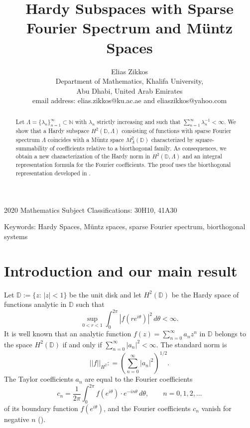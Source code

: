 \documentclass[11pt, a4paper]{article}
\begin{document}
\title{Hardy Subspaces with Sparse Fourier Spectrum and M\"{u}ntz Spaces}
\author{Elias Zikkos\\
Department of Mathematics, Khalifa University, \\
Abu Dhabi, United Arab Emirates\\
email address:  elias.zikkos@ku.ac.ae and eliaszikkos@yahoo.com}



\maketitle

\begin{abstract}
Let $\Lambda=\{\lambda_n\}_{n=1}^{\infty}\subset\mathbb{N}$ with $\lambda_n$ strictly increasing and such that
$\sum_{n=1}^{\infty}\lambda_n^{-1}<\infty$.
We show that a Hardy subspace $H^2 (\mathbb{D}, \Lambda)$ consisting of functions with sparse Fourier spectrum $\Lambda$
coincides with a M\"{u}ntz space $\overline{M^2_{\Lambda}}(\mathbb{D})$ characterized by square-summability of coefficients relative to a biorthogonal family. As consequences, we obtain a new characterization of the Hardy norm in $H^2 (\mathbb{D}, \Lambda)$ and an integral representation formula for the Fourier coefficients. The proof uses the biorthogonal representation developed in
\cite{Zikkos2026Acta}.
\end{abstract}



2020 Mathematics Subject Classifications: 30H10, 41A30

Keywords: Hardy Spaces, M\"{u}ntz spaces, sparse Fourier spectrum, biorthogonal systems


\section{Introduction and our main result}


Let $\mathbb{D}:=\{z:\, |z|<1\}$ be the unit disk and let  $H^2(\mathbb{D})$ be the Hardy space of functions analytic in
$\mathbb{D}$ such that
\[
\sup_{0<r<1} \int_{0}^{2\pi} |f(re^{i\theta})|^2\, d\theta<\infty.
\]
It is well known that an analytic function $f(z)=\sum_{n=0}^{\infty} a_n z^n$ in
$\mathbb{D}$ belongs to the space $H^2(\mathbb{D})$
if and only if $\sum_{n=0}^{\infty} |a_n|^2<\infty$. The standard norm is
\[
||f||_{H^2} : = \left(\sum_{n=0}^{\infty} |a_n|^2\right)^{1/2}.
\]
The Taylor coefficients $a_n$ are equal to the Fourier coefficients
\[
c_n=\frac{1}{2\pi}\int_{0}^{2\pi} f(e^{i\theta})\cdot e^{-i n\theta}\, d\theta,\qquad n=0, 1, 2, \dots
\]
of its boundary function $f(e^{i\theta})$, and the Fourier coefficients $c_n$ vanish for negative $n$ (\cite[Theorem 3.4]{Duren}).
\end{document}
